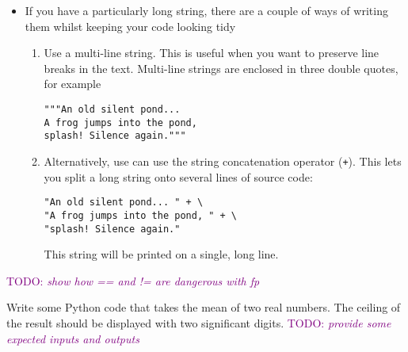 \documentclass[a4paper,twoside]{memoir}
\makeatletter
\newcommand{\FrameTitle}[2]{%
  \fboxrule=\FrameRule \fboxsep=\FrameSep
  \fbox{\vbox{\nobreak \vskip -0.7\FrameSep
    \rlap{\centerline{\strut#1}}\nobreak\nointerlineskip%
    \vskip 0.7\FrameSep
    \hbox{#2}}}}
\newenvironment{framewithtitle}[2][\FrameFirst@Lab\ (cont.)]{%
  \def\FrameFirst@Lab{\textbf{#2}}%
  \def\FrameCont@Lab{\textbf{#1}}%
  \def\FrameCommand##1{%
    \FrameTitle{\FrameFirst@Lab}{##1}}%
  \def\FirstFrameCommand##1{%
    \FrameTitle{\FrameFirst@Lab}{##1}}%
  \def\MidFrameCommand##1{%
    \FrameTitle{\FrameCont@Lab}{##1}}%
  \def\LastFrameCommand##1{%
    \FrameTitle{\FrameCont@Lab}{##1}}%
\MakeFramed{\advance\hsize-\width \FrameRestore}}%
{\endMakeFramed}
\newcounter{exercisectr}
\newenvironment{exercise}
{\stepcounter{exercisectr}\begin{framewithtitle}{Practical \arabic{exercisectr}}}
{\end{framewithtitle}}
\newcommand{\shellcmd}{\texttt}
\newcommand{\TODO}[1]{\textcolor{purple}{TODO: \emph{#1}}}
\makeatother
\begin{document}
\begin{itemize}
\item If you have a particularly long string, there are a couple of ways of writing them whilst keeping your code looking tidy
\begin{enumerate}
\item Use a multi-line string.  This is useful when you want to preserve line breaks in the text.  Multi-line strings are enclosed in three double quotes, for example
\begin{verbatim}
"""An old silent pond...
A frog jumps into the pond,
splash! Silence again."""
\end{verbatim}
\item Alternatively, use can use the string concatenation operator (\shellcmd{+}).  This lets you split a long string onto several lines of source code:
\begin{verbatim}
"An old silent pond... " + \
"A frog jumps into the pond, " + \
"splash! Silence again."
\end{verbatim}
This string will be printed on a single, long line.
\end{enumerate}

\end{itemize}

\begin{exercise}
\TODO{show how == and != are dangerous with fp}

Write some Python code that takes the mean of two real numbers.  The ceiling of the result should be displayed with two significant digits.  \TODO{provide some expected inputs and outputs}
\end{exercise}
\end{document}
